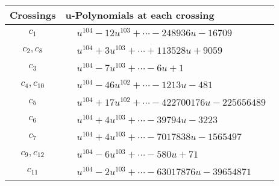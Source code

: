 \documentclass[1p]{elsarticle_modified}
\theoremstyle{definition}
\begin{document}
\begin{tabular}{m{50pt}|m{274pt}}
Crossings & \hspace{64pt}u-Polynomials at each crossing \\
\hline $$\begin{aligned}c_{1}\end{aligned}$$&$\begin{aligned}
&u^{104}-12 u^{103}+\cdots-248936 u-16709
\end{aligned}$\\
\hline $$\begin{aligned}c_{2},c_{8}\end{aligned}$$&$\begin{aligned}
&u^{104}+3 u^{103}+\cdots+113528 u+9059
\end{aligned}$\\
\hline $$\begin{aligned}c_{3}\end{aligned}$$&$\begin{aligned}
&u^{104}-7 u^{103}+\cdots-6 u+1
\end{aligned}$\\
\hline $$\begin{aligned}c_{4},c_{10}\end{aligned}$$&$\begin{aligned}
&u^{104}-46 u^{102}+\cdots-1213 u-481
\end{aligned}$\\
\hline $$\begin{aligned}c_{5}\end{aligned}$$&$\begin{aligned}
&u^{104}+17 u^{102}+\cdots-422700176 u-225656489
\end{aligned}$\\
\hline $$\begin{aligned}c_{6}\end{aligned}$$&$\begin{aligned}
&u^{104}+4 u^{103}+\cdots-39794 u-3223
\end{aligned}$\\
\hline $$\begin{aligned}c_{7}\end{aligned}$$&$\begin{aligned}
&u^{104}+4 u^{103}+\cdots-7017838 u-1565497
\end{aligned}$\\
\hline $$\begin{aligned}c_{9},c_{12}\end{aligned}$$&$\begin{aligned}
&u^{104}-6 u^{103}+\cdots-580 u+71
\end{aligned}$\\
\hline $$\begin{aligned}c_{11}\end{aligned}$$&$\begin{aligned}
&u^{104}-2 u^{103}+\cdots-63017876 u-39654871
\end{aligned}$\\
\hline
\end{tabular}\\~\\
\end{document}
